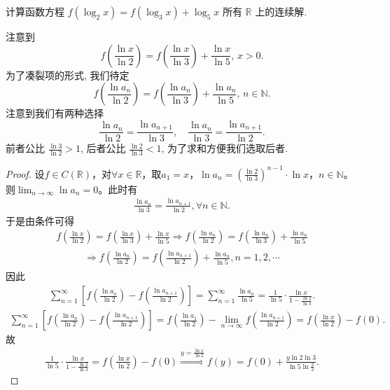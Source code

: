 \documentclass[../../main.tex]{subfiles}
\begin{document}
\begin{example}
计算函数方程 \( f(\log_2 x) = f(\log_3 x) + \log_5 x \) 所有 \(\mathbb{R}\) 上的连续解.
\end{example}
\begin{note}
注意到
\[
f\left( \frac{\ln x}{\ln 2} \right) = f\left( \frac{\ln x}{\ln 3} \right) + \frac{\ln x}{\ln 5}, \, x > 0.
\]
为了凑裂项的形式, 我们待定
\[
f\left( \frac{\ln a_n}{\ln 2} \right) = f\left( \frac{\ln a_n}{\ln 3} \right) + \frac{\ln a_n}{\ln 5}, \, n \in \mathbb{N}.
\]
注意到我们有两种选择
\[
\frac{\ln a_n}{\ln 2} = \frac{\ln a_{n+1}}{\ln 3}, \quad \frac{\ln a_n}{\ln 3} = \frac{\ln a_{n+1}}{\ln 2}.
\]
前者公比 \(\frac{\ln 3}{\ln 2} > 1\), 后者公比 \(\frac{\ln 2}{\ln 3} < 1\), 为了求和方便我们选取后者.
\end{note}
\begin{proof}
设$f \in C(\mathbb{R})$，对$\forall x \in \mathbb{R}$，取$a_1 = x$，$\ln a_n = \left( \frac{\ln 2}{\ln 3} \right)^{n-1} \cdot \ln x$，$n \in \mathbb{N}$。则$\lim_{n \to \infty} \ln a_n = 0$。此时有
\begin{align*}
\frac{\ln a_n}{\ln 3} = \frac{\ln a_{n+1}}{\ln 2}, \forall n \in \mathbb{N}.
\end{align*}
于是由条件可得
\begin{align*}
f\left( \frac{\ln x}{\ln 2} \right) = f\left( \frac{\ln x}{\ln 3} \right) + \frac{\ln x}{\ln 5} \Rightarrow f\left( \frac{\ln a_n}{\ln 2} \right) = f\left( \frac{\ln a_n}{\ln 3} \right) + \frac{\ln a_n}{\ln 5}
\end{align*}
\begin{align*}
\Rightarrow f\left( \frac{\ln a_n}{\ln 2} \right) = f\left( \frac{\ln a_{n+1}}{\ln 2} \right) + \frac{\ln a_n}{\ln 5}, n = 1, 2, \cdots
\end{align*}
因此
\begin{align*}
\sum_{n=1}^{\infty} \left[ f\left( \frac{\ln a_n}{\ln 2} \right) - f\left( \frac{\ln a_{n+1}}{\ln 2} \right) \right] = \sum_{n=1}^{\infty} \frac{\ln a_n}{\ln 5} = \frac{1}{\ln 5} \cdot \frac{\ln x}{1 - \frac{\ln 2}{\ln 3}}.
\end{align*}
\begin{align*}
\sum_{n=1}^{\infty} \left[ f\left( \frac{\ln a_n}{\ln 2} \right) - f\left( \frac{\ln a_{n+1}}{\ln 2} \right) \right] = f\left( \frac{\ln a_1}{\ln 2} \right) - \lim_{n \to \infty} f\left( \frac{\ln a_{n+1}}{\ln 2} \right) = f\left( \frac{\ln x}{\ln 2} \right) - f(0).
\end{align*}
故
\begin{align*}
\frac{1}{\ln 5} \cdot \frac{\ln x}{1 - \frac{\ln 2}{\ln 3}} = f\left( \frac{\ln x}{\ln 2} \right) - f(0) \stackrel{y = \frac{\ln x}{\ln 2}}{\Rightarrow} f(y) = f(0) + \frac{y \ln 2 \ln 3}{\ln 5 \ln \frac{3}{2}}.
\end{align*}

\end{proof}
\end{document}
